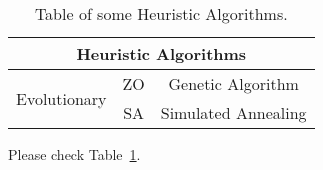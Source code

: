 \documentclass[twoside,a4paper,10pt]{article}
\begin{document}
\begin{table}[!t]
\begin{tabular}{|p{3cm}|c|c|}
\hline
\multicolumn{3}{|c|}{Heuristic Algorithms} \\
\hline
\multirow{2}{*}{Evolutionary} & ZO & Genetic Algorithm\\ 
                              & SA & Simulated Annealing \\ 
\hline
\end{tabular}
\caption{Table of some Heuristic Algorithms.}
\label{tab:table}
\end{table}
Please check Table~\ref{tab:table}.
\end{document}
